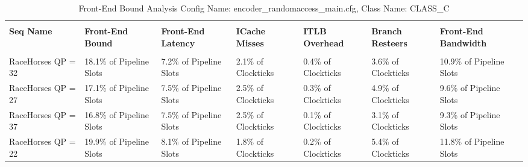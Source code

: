 \documentclass{article}%
\begin{document}
\begin{longtabu}{| X[l] | X[l] | X[l] | X[l] | X[l] | X[l] | X[l] |}%
\caption{%
Front{-}End Bound Analysis\newline%
 Config Name: encoder\_randomaccess\_main.cfg,\newline%
 Class Name: CLASS\_C\newline%
%
}%
\hline%
&&&&&&\\%
\textbf{Seq Name}&\textbf{Front{-}End Bound}&\textbf{Front{-}End Latency}&\textbf{ICache Misses}&\textbf{ITLB Overhead}&\textbf{Branch Resteers}&\textbf{Front{-}End Bandwidth}\\%
&&&&&&\\%
\hline%
\endhead%
RaceHorses\newline%
 QP = 32&18.1\% of Pipeline Slots&7.2\% of Pipeline Slots&2.1\% of Clockticks&0.4\% of Clockticks&3.6\% of Clockticks&10.9\% of Pipeline Slots\\%
\hline%
RaceHorses\newline%
 QP = 27&17.1\% of Pipeline Slots&7.5\% of Pipeline Slots&2.5\% of Clockticks&0.3\% of Clockticks&4.9\% of Clockticks&9.6\% of Pipeline Slots\\%
\hline%
RaceHorses\newline%
 QP = 37&16.8\% of Pipeline Slots&7.5\% of Pipeline Slots&2.5\% of Clockticks&0.1\% of Clockticks&3.1\% of Clockticks&9.3\% of Pipeline Slots\\%
\hline%
RaceHorses\newline%
 QP = 22&19.9\% of Pipeline Slots&8.1\% of Pipeline Slots&1.8\% of Clockticks&0.2\% of Clockticks&5.4\% of Clockticks&11.8\% of Pipeline Slots\\%
\hline%
\end{longtabu}%
\newpage%
\end{document}

